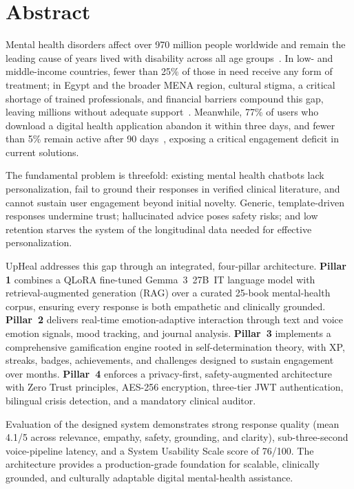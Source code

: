 \documentclass[12pt,a4paper,oneside,openany]{report}
\begin{document}
\newpage
\thispagestyle{plain}
\chapter*{Abstract}

Mental health disorders affect over 970 million people worldwide and remain the leading cause of years lived with disability across all age groups~\cite{who2021mental}. In low- and middle-income countries, fewer than 25\% of those in need receive any form of treatment; in Egypt and the broader MENA region, cultural stigma, a critical shortage of trained professionals, and financial barriers compound this gap, leaving millions without adequate support~\cite{who2021mental}. Meanwhile, 77\% of users who download a digital health application abandon it within three days, and fewer than 5\% remain active after 90 days~\cite{chen2020retention}, exposing a critical engagement deficit in current solutions.

The fundamental problem is threefold: existing mental health chatbots lack personalization, fail to ground their responses in verified clinical literature, and cannot sustain user engagement beyond initial novelty. Generic, template-driven responses undermine trust; hallucinated advice poses safety risks; and low retention starves the system of the longitudinal data needed for effective personalization.

UpHeal addresses this gap through an integrated, four-pillar architecture. \textbf{Pillar 1} combines a QLoRA fine-tuned Gemma~3~27B~IT language model with retrieval-augmented generation (RAG) over a curated 25-book mental-health corpus, ensuring every response is both empathetic and clinically grounded. \textbf{Pillar~2} delivers real-time emotion-adaptive interaction through text and voice emotion signals, mood tracking, and journal analysis. \textbf{Pillar~3} implements a comprehensive gamification engine rooted in self-determination theory, with XP, streaks, badges, achievements, and challenges designed to sustain engagement over months. \textbf{Pillar~4} enforces a privacy-first, safety-augmented architecture with Zero Trust principles, AES-256 encryption, three-tier JWT authentication, bilingual crisis detection, and a mandatory clinical auditor.

Evaluation of the designed system demonstrates strong response quality (mean 4.1/5 across relevance, empathy, safety, grounding, and clarity), sub-three-second voice-pipeline latency, and a System Usability Scale score of 76/100. The architecture provides a production-grade foundation for scalable, clinically grounded, and culturally adaptable digital mental-health assistance.
\end{document}
